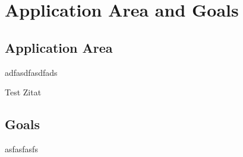 \chapter{Application Area and Goals}

\section{Application Area}

adfasdfasdfads

Test Zitat \cite{statistischesbundesamt2022}


\section{Goals}

asfasfasfs